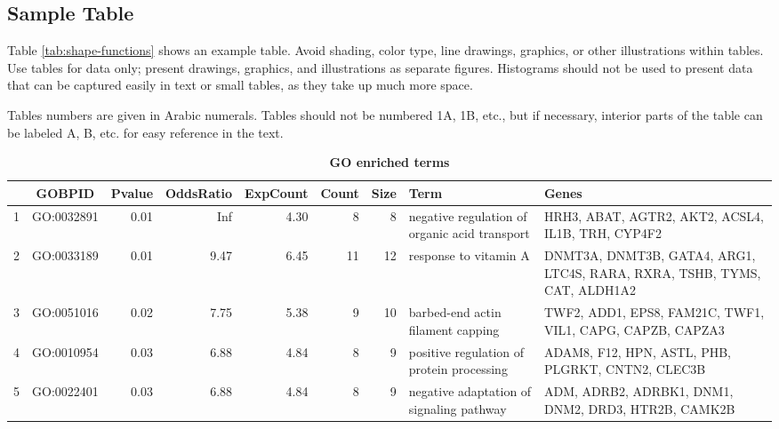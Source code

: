 \documentclass[9pt,twocolumn,twoside]{gsajnl}
\begin{document}
\subsection*{Sample Table}

Table \ref{tab:shape-functions} shows an example table. Avoid shading, color type, line drawings, graphics, or other illustrations within tables. Use tables for data only; present drawings, graphics, and illustrations as separate figures. Histograms should not be used to present data that can be captured easily in text or small tables, as they take up much more space.

Tables numbers are given in Arabic numerals. Tables should not be numbered 1A, 1B, etc., but if necessary, interior parts of the table can be labeled A, B, etc. for easy reference in the text.

\begin{table}[htbp]
\centering
\caption{\bf GO enriched terms}
\begin{tableminipage}{\textwidth}
 \begin{tabular}{|l|c|r|r|r|r|r|p{3cm}|p{3cm}|}
  \hline
 & GOBPID & Pvalue & OddsRatio & ExpCount & Count & Size & Term & Genes \\
  \hline
1 & GO:0032891 & 0.01 & Inf & 4.30 &   8 &   8 & negative regulation of organic acid transport & HRH3, ABAT, AGTR2, AKT2, ACSL4, IL1B, TRH, CYP4F2 \\
  2 & GO:0033189 & 0.01 & 9.47 & 6.45 &  11 &  12 & response to vitamin A & DNMT3A, DNMT3B, GATA4, ARG1, LTC4S, RARA, RXRA, TSHB, TYMS, CAT, ALDH1A2 \\
  3 & GO:0051016 & 0.02 & 7.75 & 5.38 &   9 &  10 & barbed-end actin filament capping & TWF2, ADD1, EPS8, FAM21C, TWF1, VIL1, CAPG, CAPZB, CAPZA3 \\
  4 & GO:0010954 & 0.03 & 6.88 & 4.84 &   8 &   9 & positive regulation of protein processing & ADAM8, F12, HPN, ASTL, PHB, PLGRKT, CNTN2, CLEC3B \\
  5 & GO:0022401 & 0.03 & 6.88 & 4.84 &   8 &   9 & negative adaptation of signaling pathway & ADM, ADRB2, ADRBK1, DNM1, DNM2, DRD3, HTR2B, CAMK2B \\
   \hline
 \end{tabular}
 \label{tab:GOenrichment}
\end{tableminipage}
\end{table}
\end{document}

